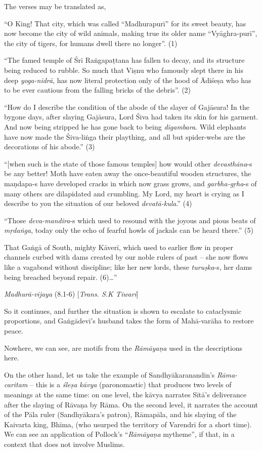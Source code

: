 The verses may be translated as, 

\begin{myquote}
“O King! That city, which was called “Madhurapurī” for its sweet beauty, has now become the city of wild animals, making true its older name “Vyāghra-purī”, the city of tigers, for humans dwell there no longer”. (1) 

“The famed temple of Śrī Raṅgapaṭtana has fallen to decay, and its structure being reduced to rubble. So much that Viṣnu who famously slept there in his deep {\sl yoga-nidrā}, has now literal protection only of the hood of Ādiśeṣa who has to be ever cautious from the falling bricks of the debris”. (2) 

“How do I describe the condition of the abode of the slayer of Gajāsura! In the bygone days, after slaying Gajāsura, Lord Śiva had taken its skin for his garment. And now being stripped he has gone back to being {\sl digambara}. Wild elephants have now made the Śiva-liṅga their plaything, and all but spider-webs are the decorations of his abode.” (3) 

“[when such is the state of those famous temples] how would other {\sl devasthāna}-s be any better! Moth have eaten away the once-beautiful wooden structures, the maṇdapa-s have developed cracks in which now grass grows, and {\sl garbha-gṛha}-s of many others are dilapidated and crumbling. My Lord, my heart is crying as I describe to you the situation of our beloved {\sl devatā-kula}.” (4) 

“Those {\sl deva-mandira}-s which used to resound with the joyous and pious beats of {\sl mṛdaṅga}, today only the echo of fearful howls of jackals can be heard there.” (5) 

That Gaṅgā of South, mighty Kāverī, which used to earlier flow in proper channels curbed with dams created by our noble rulers of past – she now flows like a vagabond without discipline; like her new lords, these {\sl turuṣka}-s, her dams being breached beyond repair. (6)…” 

\hfill {\sl Madhurā-vijaya} (8.1-6) [{\sl Trans. S.K  Tiwari}]
\end{myquote}

So it continues, and further the situation is shown to escalate to cataclysmic proportions, and Gaṅgādevī’s husband takes the form of Mahā-varāha to restore peace. 

Nowhere, we can see, are motifs from the {\sl Rāmāyaṇa} used in the descriptions here.  

On the other hand, let us take the example of Sandhyākaranandin's {\sl Rāma-caritam} – this is a {\sl śleṣa kāvya} (paronomastic) that produces two levels of meanings at the same time: on one level, the kāvya narrates Sītā’s deliverance after the slaying of Rāvaṇa by Rāma.  On the second level, it narrates the account of the Pāla ruler (Sandhyākara’s patron), Rāmapāla, and his slaying of the Kaivarta king, Bhīma, (who usurped the territory of Varendrī for a short time). We can see an application of Pollock’s “{\sl Rāmāyaṇa} mytheme”, if that, in a context that does not involve Muslims. 

